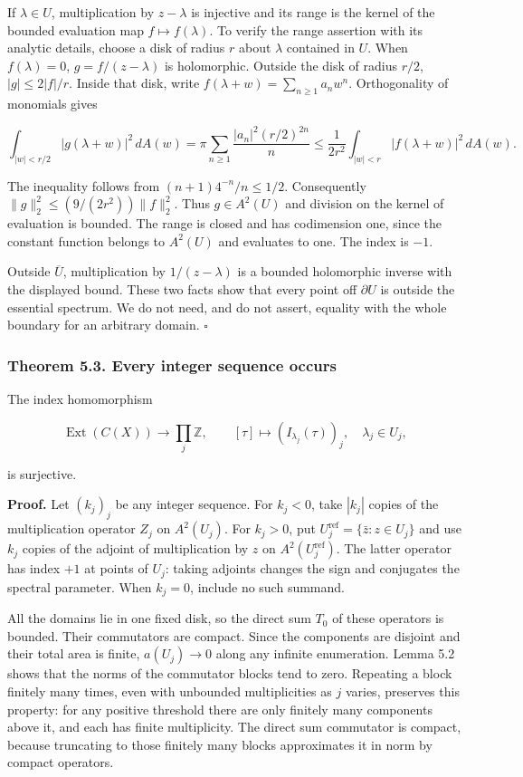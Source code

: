 \documentclass[
  11pt,
]{article}
\begin{document}
If \(\lambda\in U\), multiplication by \(z-\lambda\) is injective and
its range is the kernel of the bounded evaluation map
\(f\mapsto f(\lambda)\). To verify the range assertion with its analytic
details, choose a disk of radius \(r\) about \(\lambda\) contained in
\(U\). When \(f(\lambda)=0\), \(g=f/(z-\lambda)\) is holomorphic.
Outside the disk of radius \(r/2\), \(|g|\leq2|f|/r\). Inside that disk,
write \(f(\lambda+w)=\sum_{n\geq1}a_nw^n\). Orthogonality of monomials
gives

\[
\int_{|w|<r/2}|g(\lambda+w)|^2\,dA(w)
=\pi\sum_{n\geq1}\frac{|a_n|^2(r/2)^{2n}}n
\leq\frac1{2r^2}\int_{|w|<r}|f(\lambda+w)|^2\,dA(w).
\]

The inequality follows from \((n+1)4^{-n}/n\leq1/2\). Consequently
\(\|g\|_2^2\leq(9/(2r^2))\|f\|_2^2\). Thus \(g\in A^2(U)\) and division
on the kernel of evaluation is bounded. The range is closed and has
codimension one, since the constant function belongs to \(A^2(U)\) and
evaluates to one. The index is \(-1\).

Outside \(\overline U\), multiplication by \(1/(z-\lambda)\) is a
bounded holomorphic inverse with the displayed bound. These two facts
show that every point off \(\partial U\) is outside the essential
spectrum. We do not need, and do not assert, equality with the whole
boundary for an arbitrary domain. \(\square\)

\subsubsection{Theorem 5.3. Every integer sequence
occurs}\label{theorem-5.3.-every-integer-sequence-occurs}

The index homomorphism

\[
\operatorname{Ext}(C(X))\longrightarrow\prod_j\mathbb Z,
\qquad [\tau]\longmapsto(I_{\lambda_j}(\tau))_j,
\quad \lambda_j\in U_j,
\]

is surjective.

\textbf{Proof.} Let \((k_j)_j\) be any integer sequence. For \(k_j<0\),
take \(|k_j|\) copies of the multiplication operator \(Z_j\) on
\(A^2(U_j)\). For \(k_j>0\), put
\(U_j^{\mathrm{ref}}=\{\bar z:z\in U_j\}\) and use \(k_j\) copies of the
adjoint of multiplication by \(z\) on \(A^2(U_j^{\mathrm{ref}})\). The
latter operator has index \(+1\) at points of \(U_j\): taking adjoints
changes the sign and conjugates the spectral parameter. When \(k_j=0\),
include no such summand.

All the domains lie in one fixed disk, so the direct sum \(T_0\) of
these operators is bounded. Their commutators are compact. Since the
components are disjoint and their total area is finite, \(a(U_j)\to0\)
along any infinite enumeration. Lemma 5.2 shows that the norms of the
commutator blocks tend to zero. Repeating a block finitely many times,
even with unbounded multiplicities as \(j\) varies, preserves this
property: for any positive threshold there are only finitely many
components above it, and each has finite multiplicity. The direct sum
commutator is compact, because truncating to those finitely many blocks
approximates it in norm by compact operators.
\end{document}
